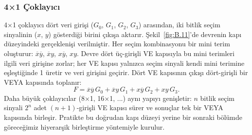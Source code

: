 \subsubsection{4×1 Çoklayıcı}
4×1 çoklayıcı dört veri girişi ($G_0$, $G_1$, $G_2$, $G_3$) arasından, iki bitlik seçim sinyalinin ($x$, $y$) gösterdiği birini çıkışa aktarır. Şekil~\ref{fig:B.11}'de devrenin kapı düzeyindeki gerçeklenişi verilmiştir. Her seçim kombinasyonu bir mini terim oluşturur: $\overline{x}\overline{y}$, $\overline{x}y$, $x\overline{y}$, $xy$. Devre dört üç-girişli VE kapısıyla bu mini terimleri ilgili veri girişine zorlar; her VE kapısı yalnızca seçim sinyali kendi mini terimine eşleştiğinde 1 üretir ve veri girişini geçirir. Dört VE kapısının çıkışı dört-girişli bir VEYA kapısında toplanır:
\[ F = \overline{x}\overline{y}\,G_0 + \overline{x}y\,G_1 + x\overline{y}\,G_2 + xy\,G_3. \]
Daha büyük çoklayıcılar (8×1, 16×1, ...) aynı yapıyı genişletir: $n$ bitlik seçim sinyali $2^n$ adet $(n{+}1)$-girişli VE kapısı sürer ve sonuçlar tek bir VEYA kapısında birleşir. Pratikte bu doğrudan kapı düzeyi yerine bir sonraki bölümde göreceğimiz hiyerarşik birleştirme yöntemiyle kurulur.

